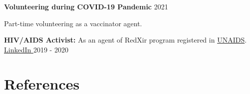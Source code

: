\documentclass[letterpaper,11pt]{article} %
\begin{document}
\textbf{Volunteering during COVID-19 Pandemic} \hfill \footnotesize{2021} \normalsize
\vspace{-0.5\baselineskip}
\begin{adjustwidth}{0.5cm}{2cm}
Part-time volunteering as a vaccinator agent.
\end{adjustwidth}

\textbf{HIV/AIDS Activist:} As an agent of RedXir program registered in \href{https://www.unaids.org/en}{UNAIDS}.
\space
\href{https://www.linkedin.com/company/redxir/}{LinkedIn \faExternalLink*}
\hfill \footnotesize{2019 - 2020} \normalsize






\section{References}
\end{document}
